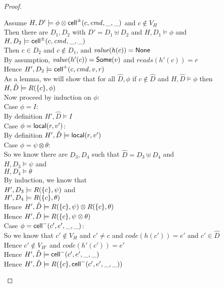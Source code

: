 \begin{proof}
  \begin{tabbedproof}
    \oo Assume $H, D' \models \phi \otimes \mathsf{cell}^{\pm}({c}, {\mathit{cmd}}, {\_}, {\_})$ and $c \not\in V_H$ \\
    \oo Then there are $D_1, D_2$ with $D' = D_1 \uplus D_2$ and $H, D_1 \models \phi$ and $H, D_2 \models \mathsf{cell}^{\pm}({c}, {\mathit{cmd}}, {\_}, {\_})$ \\
    \oo Then $c \in D_2$ and $c \not \in D_1$, and $\mathit{value}(h(c)) = \mathsf{None}$ \\
    \oo By assumption, $\mathit{value}(h'(c)) = \mathsf{Some}(v)$ and $\mathit{reads}(h'(c)) = r$ \\
    \oo Hence $H', D_2 \models \mathsf{cell}^{+}({c}, {\mathit{cmd}}, {v}, {r})$ \\
    \oo As a lemma, we will show that for all $\hat{D}, \phi$ if $c \not\in \hat{D}$ and $H, \hat{D} \models \phi$ then $H, \hat{D} \models R(\{{c}\}, \phi)$ \\
    \ooo Now proceed by induction on $\phi$: \\
    \ooo Case $\phi = I$: \\
    \oooo By definition $H', \hat{D} \models I$ \\
    \ooo Case $\phi = \mathsf{local}({r}, {v'})$: \\
    \oooo By definition $H', \hat{D} \models \mathsf{local}({r}, {v'})$ \\
    \ooo Case $\phi = \psi \otimes \theta$: \\
    \oooo So we know there are $D_3, D_4$ such that $\hat{D} = D_3 \uplus D_4$ and \\
    \oooox $H, D_3 \models \psi$ and \\
    \oooox $H, D_4 \models \theta$ \\
    \oooo By induction, we know that \\
    \oooox $H', D_3 \models R(\{{c}\}, \psi)$ and \\
    \oooox $H', D_4 \models R(\{{c}\}, \theta)$ \\
    \oooo Hence $H', \hat{D} \models R(\{{c}\}, \psi) \otimes R(\{{c}\}, \theta)$ \\
    \oooo Hence $H', \hat{D} \models R(\{{c}\}, \psi \otimes \theta)$ \\

    \ooo Case $\phi = \mathsf{cell}^{-}({c'}, {e'}, {\_}, {\_})$: \\
    \oooo So we know that $c' \not\in V_H$ and $c' \not= c$ and $\mathit{code}(h(c')) = e'$ and $c' \in \hat{D}$\\
    \oooo Hence $c' \not\in V_{H'}$ and $\mathit{code}(h'(c')) = e'$\\
    \oooo Hence $H', \hat{D} \models \mathsf{cell}^{-}({c'}, {e'}, {\_}, {\_})$ \\
    \oooo Hence $H', \hat{D} \models R(\{{c}\}, \mathsf{cell}^{-}({c'}, {e'}, {\_}, {\_}))$ \\


\end{tabbedproof}
\end{proof}
